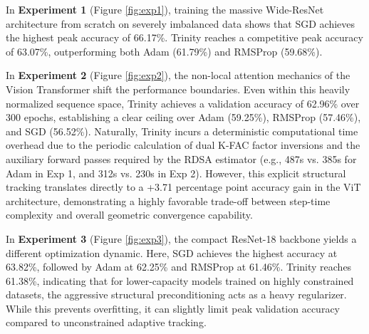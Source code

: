 \documentclass[conference]{IEEEtran}
\begin{document}
In \textbf{Experiment 1} (Figure \ref{fig:exp1}), training the massive Wide-ResNet architecture from scratch on severely imbalanced data shows that SGD achieves the highest peak accuracy of 66.17\%. Trinity reaches a competitive peak accuracy of 63.07\%, outperforming both Adam (61.79\%) and RMSProp (59.68\%). 

In \textbf{Experiment 2} (Figure \ref{fig:exp2}), the non-local attention mechanics of the Vision Transformer shift the performance boundaries. Even within this heavily normalized sequence space, Trinity achieves a validation accuracy of 62.96\% over 300 epochs, establishing a clear ceiling over Adam (59.25\%), RMSProp (57.46\%), and SGD (56.52\%). Naturally, Trinity incurs a deterministic computational time overhead due to the periodic calculation of dual K-FAC factor inversions and the auxiliary forward passes required by the RDSA estimator (e.g., 487s vs. 385s for Adam in Exp 1, and 312s vs. 230s in Exp 2). However, this explicit structural tracking translates directly to a +3.71 percentage point accuracy gain in the ViT architecture, demonstrating a highly favorable trade-off between step-time complexity and overall geometric convergence capability.

In \textbf{Experiment 3} (Figure \ref{fig:exp3}), the compact ResNet-18 backbone yields a different optimization dynamic. Here, SGD achieves the highest accuracy at 63.82\%, followed by Adam at 62.25\% and RMSProp at 61.46\%. Trinity reaches 61.38\%, indicating that for lower-capacity models trained on highly constrained datasets, the aggressive structural preconditioning acts as a heavy regularizer. While this prevents overfitting, it can slightly limit peak validation accuracy compared to unconstrained adaptive tracking.


\pgfplotsset{compat=1.18}
\end{document}
